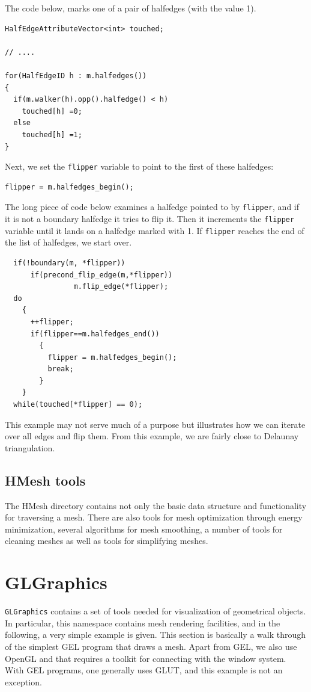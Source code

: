 \documentclass[a4paper]{article}
\begin{document}
The code below, marks one of a pair of halfedges (with the value 1).
\begin{verbatim}
HalfEdgeAttributeVector<int> touched;

// ....

for(HalfEdgeID h : m.halfedges())
{
  if(m.walker(h).opp().halfedge() < h)
    touched[h] =0;
  else
    touched[h] =1;
}
\end{verbatim}
Next, we set the \texttt{flipper} variable to point to the first of these halfedges:
\begin{verbatim}
flipper = m.halfedges_begin();
\end{verbatim}
The long piece of code below examines a halfedge pointed to by \texttt{flipper}, and if it is not a boundary halfedge it tries to flip it. Then it increments the \texttt{flipper} variable until it lands on a halfedge marked with 1. If \texttt{flipper} reaches the end of the list of halfedges, we start over.
\begin{verbatim}
  if(!boundary(m, *flipper)) 
      if(precond_flip_edge(m,*flipper))
                m.flip_edge(*flipper);
  do
    {
      ++flipper;
      if(flipper==m.halfedges_end())
        {
          flipper = m.halfedges_begin();
          break;
        }
    }
  while(touched[*flipper] == 0);
\end{verbatim}
This example may not serve much of a purpose but illustrates how we can iterate over all edges and flip them. From this example, we are fairly close to Delaunay triangulation.

\subsection{HMesh tools}

The HMesh directory contains not only the basic data structure and functionality for traversing a mesh. There are also tools for mesh optimization through energy minimization, several algorithms for mesh smoothing, a number of tools for cleaning meshes as well as tools for simplifying meshes.

\section{GLGraphics}

\texttt{GLGraphics} contains a set of tools needed for visualization of geometrical objects. In particular, this namespace contains mesh rendering facilities, and in the following, a very simple example is given. This section is basically a walk through of the simplest GEL program that draws a mesh. Apart from GEL, we also use OpenGL and that requires a toolkit for connecting with the window system. With GEL programs, one generally uses GLUT, and this example is not an exception.
\end{document}
